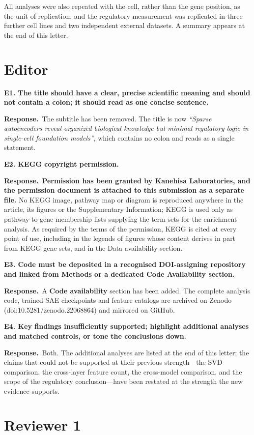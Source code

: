 \documentclass[11pt]{article}
\newcommand{\point}[1]{\vspace{0.7em}\noindent\textbf{#1}\par\vspace{0.15em}}
\newcommand{\reply}{\par\vspace{0.3em}\noindent\textbf{Response.}\ }
\begin{document}
\noindent
All analyses were also repeated with the cell, rather than the gene position, as the unit of
replication, and the regulatory measurement was replicated in three further cell lines and two
independent external datasets. A summary appears at the end of this letter.

\section*{Editor}

\point{E1. The title should have a clear, precise scientific meaning and should not contain a
colon; it should read as one concise sentence.}
\reply The subtitle has been removed. The title is now
\emph{``Sparse autoencoders reveal organized biological knowledge but minimal regulatory logic in
single-cell foundation models''}, which contains no colon and reads as a single statement.

\point{E2. KEGG copyright permission.}
\reply \textbf{Permission has been granted by Kanehisa Laboratories, and the permission document is
attached to this submission as a separate file.} No KEGG image, pathway map or diagram is
reproduced anywhere in the article, its figures or the Supplementary Information; KEGG is used only
as pathway-to-gene membership lists supplying the term sets for the enrichment analysis. As
required by the terms of the permission, KEGG is cited at every point of use, including in the
legends of figures whose content derives in part from KEGG gene sets, and in the Data availability
section.

\point{E3. Code must be deposited in a recognised DOI-assigning repository and linked from Methods
or a dedicated Code Availability section.}
\reply A \textbf{Code availability} section has been added. The complete analysis code, trained SAE
checkpoints and feature catalogs are archived on Zenodo (doi:10.5281/zenodo.22068864) and mirrored
on GitHub.

\point{E4. Key findings insufficiently supported; highlight additional analyses and matched
controls, or tone the conclusions down.}
\reply Both. The additional analyses are listed at the end of this letter; the claims that could
not be supported at their previous strength---the SVD comparison, the cross-layer feature count,
the cross-model comparison, and the scope of the regulatory conclusion---have been restated at the
strength the new evidence supports.

\section*{Reviewer 1}
\end{document}
